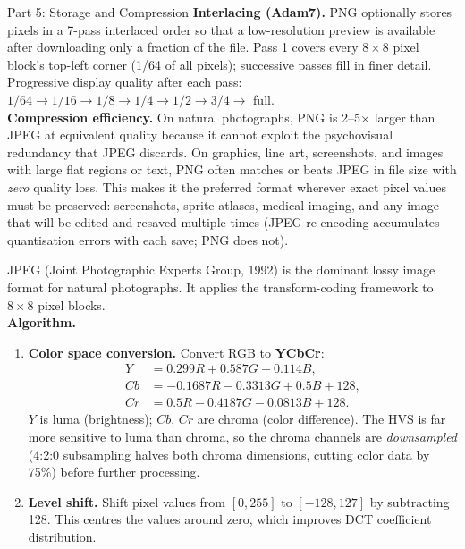 \documentclass[letterpaper]{article}
\begin{document}
\begin{notes}{Part 5: Storage and Compression}
\textbf{Interlacing (Adam7).} PNG optionally stores pixels in a 7-pass interlaced order so that a low-resolution preview is available after downloading only a fraction of the file. Pass 1 covers every $8\times8$ pixel block's top-left corner (1/64 of all pixels); successive passes fill in finer detail. Progressive display quality after each pass: $1/64 \to 1/16 \to 1/8 \to 1/4 \to 1/2 \to 3/4 \to$ full.\\

\textbf{Compression efficiency.} On natural photographs, PNG is 2--5$\times$ larger than JPEG at equivalent quality because it cannot exploit the psychovisual redundancy that JPEG discards. On graphics, line art, screenshots, and images with large flat regions or text, PNG often matches or beats JPEG in file size with \emph{zero} quality loss. This makes it the preferred format wherever exact pixel values must be preserved: screenshots, sprite atlases, medical imaging, and any image that will be edited and resaved multiple times (JPEG re-encoding accumulates quantisation errors with each save; PNG does not).


JPEG (Joint Photographic Experts Group, 1992) is the dominant lossy image format for natural photographs. It applies the transform-coding framework to $8\times8$ pixel blocks.\\

\textbf{Algorithm.}

\begin{enumerate}
    \item \textbf{Color space conversion.} Convert RGB to \textbf{YCbCr}:
    \begin{align*}
    Y  &= 0.299R + 0.587G + 0.114B,\\
    Cb &= -0.1687R - 0.3313G + 0.5B + 128,\\
    Cr &= 0.5R - 0.4187G - 0.0813B + 128.
    \end{align*}
    $Y$ is luma (brightness); $Cb$, $Cr$ are chroma (color difference). The HVS is far more sensitive to luma than chroma, so the chroma channels are \emph{downsampled} (4:2:0 subsampling halves both chroma dimensions, cutting color data by 75\%) before further processing.
    
    \item \textbf{Level shift.} Shift pixel values from $[0, 255]$ to $[-128, 127]$ by subtracting 128. This centres the values around zero, which improves DCT coefficient distribution.
    

\end{enumerate}
\end{notes}
\end{document}
